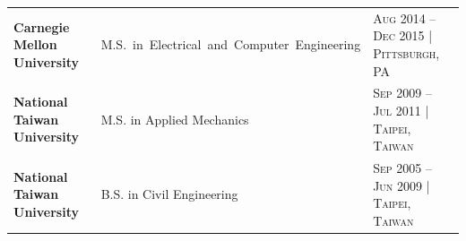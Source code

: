 \begin{flushleft}
\begin{tabular}{@{}p{\dimexpr(\linewidth-4\tabcolsep)/3\relax} p{\dimexpr(\linewidth-4\tabcolsep)/3\relax} p{\dimexpr(\linewidth-4\tabcolsep)/3\relax}@{}}
\textbf{Carnegie Mellon University} &
\mbox{M.S. in Electrical and Computer Engineering} &
\hfill\footnotesize\textsc{Aug 2014 -- Dec 2015 | Pittsburgh, PA} \\[0.2em]
\textbf{National Taiwan University} &
M.S. in Applied Mechanics &
\hfill\footnotesize\textsc{Sep 2009 -- Jul 2011 | Taipei, Taiwan} \\[0.2em]
\textbf{National Taiwan University} &
B.S. in Civil Engineering &
\hfill\footnotesize\textsc{Sep 2005 -- Jun 2009 | Taipei, Taiwan}
\end{tabular}
\end{flushleft}